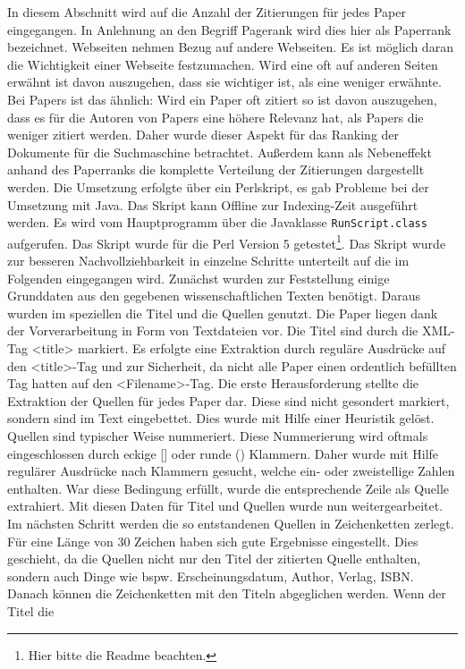 In diesem Abschnitt wird auf die Anzahl der Zitierungen für jedes
Paper eingegangen. In Anlehnung an den Begriff Pagerank wird dies hier
als Paperrank bezeichnet.  Webseiten nehmen Bezug auf andere
Webseiten. Es ist möglich daran die Wichtigkeit einer Webseite
festzumachen. Wird eine oft auf anderen Seiten erwähnt ist davon
auszugehen, dass sie wichtiger ist, als eine weniger erwähnte. Bei
Papers ist das ähnlich: Wird ein Paper oft zitiert so ist davon
auszugehen, dass es für die Autoren von Papers eine höhere Relevanz
hat, als Papers die weniger zitiert werden. Daher wurde dieser Aspekt
für das Ranking der Dokumente für die Suchmaschine
betrachtet. Außerdem kann als Nebeneffekt anhand des Paperranks die
komplette Verteilung der Zitierungen dargestellt werden.  Die
Umsetzung erfolgte über ein Perlskript, es gab Probleme bei der
Umsetzung mit Java. Das Skript kann Offline zur Indexing-Zeit
ausgeführt werden. Es wird vom Hauptprogramm über die Javaklasse
\lstinline{RunScript.class} aufgerufen. Das Skript wurde für die Perl
Version 5 getestet\footnote{Hier bitte die Readme beachten.}. Das
Skript wurde zur besseren Nachvollziehbarkeit in einzelne Schritte
unterteilt auf die im Folgenden eingegangen wird.  Zunächst wurden zur
Feststellung einige Grunddaten aus den gegebenen wissenschaftlichen
Texten benötigt. Daraus wurden im speziellen die Titel und die Quellen
genutzt. Die Paper liegen dank der Vorverarbeitung in Form von
Textdateien vor. Die Titel sind durch die XML-Tag <title> markiert. Es
erfolgte eine Extraktion durch reguläre Ausdrücke auf den <title>-Tag
und zur Sicherheit, da nicht alle Paper einen ordentlich befüllten Tag
hatten auf den <Filename>-Tag.  Die erste Herausforderung stellte die
Extraktion der Quellen für jedes Paper dar. Diese sind nicht gesondert
markiert, sondern sind im Text eingebettet. Dies wurde mit Hilfe einer
Heuristik gelöst. Quellen sind typischer Weise nummeriert. Diese
Nummerierung wird oftmals eingeschlossen durch eckige [] oder runde ()
Klammern. Daher wurde mit Hilfe regulärer Ausdrücke nach Klammern
gesucht, welche ein- oder zweistellige Zahlen enthalten. War diese
Bedingung erfüllt, wurde die entsprechende Zeile als Quelle
extrahiert. Mit diesen Daten für Titel und Quellen wurde nun
weitergearbeitet.  Im nächsten Schritt werden die so entstandenen
Quellen in Zeichenketten zerlegt. Für eine Länge von 30 Zeichen haben
sich gute Ergebnisse eingestellt. Dies geschieht, da die Quellen nicht
nur den Titel der zitierten Quelle enthalten, sondern auch Dinge wie
bspw. Erscheinungsdatum, Author, Verlag, ISBN.  Danach können die
Zeichenketten mit den Titeln abgeglichen werden. Wenn der Titel die
